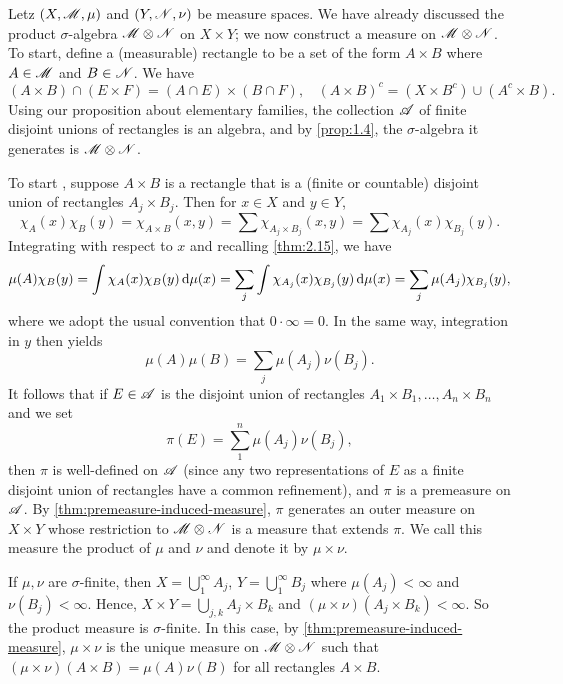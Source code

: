 \documentclass[12pt]{article} %
\begin{document}
Letz $(X, \mathscr{M}, \mu)$ and $(Y, \mathscr{N}, \nu)$ be measure spaces. We have already discussed the product $\sigma$-algebra $\mathscr{M} \otimes \mathscr{N}$ on $X \times Y$; we now construct a measure on $\mathscr{M} \otimes \mathscr{N}$. To start, define a (measurable) rectangle to be a set of the form $A \times B$ where $A \in \mathscr{M}$ and $B \in \mathscr{N}$. We have \[(A \times B) \cap (E \times F) = (A \cap E) \times (B \cap F), \ \ \ \ (A \times B)^c = (X \times B^c) \cup (A^c \times B).\] Using our proposition about elementary families, the collection $\mathscr{A}$ of finite disjoint unions of rectangles is an algebra, and by \cref{prop:1.4}, the $\sigma$-algebra it generates is $\mathscr{M} \otimes \mathscr{N}$.

To start , suppose $A \times B$ is a rectangle that is a (finite or countable) disjoint union of rectangles $A_j \times B_j$. Then for $x \in X$ and $y \in Y$, \[\chi_A(x) \chi_B(y) = \chi_{A \times B} (x, y) = \sum \chi_{A_j \times B_j}(x, y) = \sum \chi_{A_j} (x) \chi_{B_j}(y).\] Integrating with respect to $x$ and recalling \cref{thm:2.15}, we have \begin{align*}
    \mu(A) \chi_B(y) = \int \chi_A(x)\chi_B(y) \, \mathrm{d} \mu(x) = \sum_j \int \chi_{A_j} (x) \chi_{B_j}(y) \, \mathrm{d} \mu(x) = \sum_j \mu(A_j) \chi_{B_j}(y),
\end{align*}
where we adopt the usual convention that $0 \cdot \infty = 0$.
In the same way, integration in $y$ then yields \[\mu(A) \mu(B) = \sum_j \mu(A_j) \nu(B_j).\]
It follows that if $E \in \mathscr{A}$ is the disjoint union of rectangles $A_1 \times B_1, \ldots, A_n \times B_n$ and we set \[\pi(E) = \sum_1^n \mu(A_j)\nu(B_j),\] then $\pi$ is well-defined on $\mathscr{A}$ (since any two representations of $E$ as a finite disjoint union of rectangles have a common refinement), and $\pi$ is a premeasure on $\mathscr{A}$. By \cref{thm:premeasure-induced-measure}, $\pi$ generates an outer measure on $X \times Y$ whose restriction to $\mathscr{M} \otimes \mathscr{N}$ is a measure that extends $\pi$. We call this measure the product of $\mu$ and $\nu$ and denote it by $\mu \times \nu$.

If $\mu, \nu$ are $\sigma$-finite, then $X = \bigcup_1^\infty A_j$, $Y = \bigcup_1^\infty B_j$ where $\mu(A_j) < \infty$ and $\nu(B_j) < \infty$. Hence, $X \times Y = \bigcup_{j,k} A_j \times B_k$ and $(\mu \times \nu)(A_j \times B_k) < \infty$. So the product measure is $\sigma$-finite. In this case, by \cref{thm:premeasure-induced-measure}, $\mu \times \nu$ is the unique measure on $\mathscr{M} \otimes \mathscr{N}$ such that $(\mu \times \nu)(A \times B) = \mu(A)\nu(B)$ for all rectangles $A \times B$.
\end{document}
